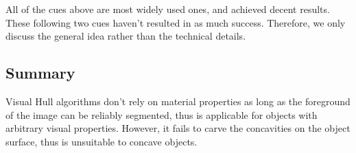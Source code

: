 All of the cues above are most widely used ones, and achieved decent results. These following two cues haven't resulted in as much success. Therefore, we only discuss the general idea rather than the technical details.

\subsection{Summary}
Visual Hull algorithms don't rely on material properties as long as the foreground of the image can be reliably segmented, thus is applicable for objects with arbitrary visual properties. However, it fails to carve the concavities on the object surface, thus is unsuitable to concave objects.



